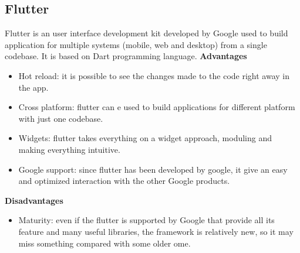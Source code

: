 \documentclass[../ITD.tex]{subfiles}
\begin{document}
    \subsection{Flutter}\label{subsec:flutter}
    Flutter is an user interface development kit developed by Google used to build application for multiple systems (mobile, web and desktop) from a single codebase.
    It is based on Dart programming language.
    \newline
    \textbf{Advantages}
    \begin{itemize}
        \item Hot reload: it is possible to see the changes made to the code right away in the app.
        \item Cross platform: flutter can e used to build applications for different platform with just one codebase.
        \item Widgets: flutter takes everything on a widget approach, moduling and making everything intuitive.
        \item Google support: since flutter has been developed by google, it give an easy and optimized interaction with the other Google products.
    \end{itemize}

    \textbf{Disadvantages}
    \begin{itemize}
        \item Maturity: even if the flutter is supported by Google that provide all its feature and many useful libraries, the framework is relatively new, so it may miss something compared with some older ome.
    \end{itemize}
\end{document}
